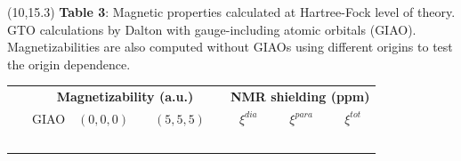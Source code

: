 \documentclass[a0,portrait]{a0poster}
\begin{document}
\begin{textblock}{7}(10,15.3)
\footnotesize
\textbf{Table 3}: Magnetic properties calculated at
Hartree-Fock level of theory. GTO calculations by Dalton\cite{Dalton} 
with gauge-including atomic orbitals (GIAO). Magnetizabilities are also computed 
without GIAOs using different origins to test the origin dependence.
\begin{table}
    \normalsize
    \centering
    \begin{tabular}{|r|crr|ccc|}
\hline                   &\multicolumn{3}{c|}{\textbf{Magnetizability (a.u.)}}
                         &\multicolumn{3}{c|}{\textbf{NMR shielding (ppm)}}\\
                         & GIAO          & $(0,0,0)$\ \  & $(5,5,5)$\ \  &$\xi^{dia}$   & $\xi^{para}$  &$\xi^{tot}$    \\
\hline  \hspace{55mm}\   &\hspace{40mm}\ &\hspace{40mm}\ &\hspace{40mm}\ &\hspace{40mm}\ &\hspace{40mm}\ &\hspace{40mm}\ \\

\end{tabular}
\end{table}
\end{textblock}
\end{document}
